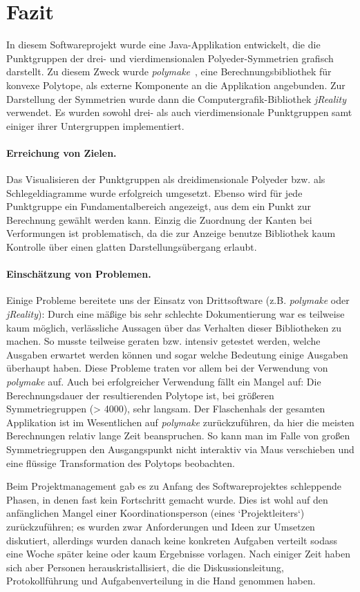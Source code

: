 \section{Fazit}
In diesem Softwareprojekt wurde eine Java-Applikation entwickelt, die die Punktgruppen der drei- und vierdimensionalen
Polyeder-Symmetrien grafisch darstellt. Zu diesem Zweck wurde \emph{polymake}~\cite{polymake}, eine Berechnungsbibliothek für
konvexe Polytope, als externe Komponente an die Applikation angebunden. Zur Darstellung der Symmetrien wurde dann die Computergrafik-Bibliothek
\emph{jReality}~\cite{jreality} verwendet.
Es wurden sowohl drei- als auch vierdimensionale Punktgruppen samt einiger ihrer Untergruppen implementiert.

\paragraph{Erreichung von Zielen.}
Das Visualisieren der Punktgruppen als dreidimensionale Polyeder bzw. als Schlegeldiagramme wurde erfolgreich umgesetzt. Ebenso wird für jede Punktgruppe ein Fundamentalbereich angezeigt, aus dem ein Punkt zur Berechnung gewählt werden kann. 
Einzig die Zuordnung der Kanten bei Verformungen ist problematisch, da die zur Anzeige benutze Bibliothek kaum Kontrolle über
einen glatten Darstellungsübergang erlaubt.
\paragraph{Einschätzung von Problemen.}
Einige Probleme bereitete uns der Einsatz von Drittsoftware (z.B. \emph{polymake} oder \emph{jReality}): Durch eine mäßige bis sehr schlechte
Dokumentierung war es teilweise kaum möglich, verlässliche Aussagen über das Verhalten dieser Bibliotheken zu machen. So musste teilweise geraten bzw. intensiv getestet werden, welche Ausgaben erwartet werden können und sogar welche Bedeutung einige Ausgaben überhaupt haben. Diese Probleme traten vor allem bei der Verwendung von \emph{polymake} auf.
Auch bei erfolgreicher Verwendung fällt ein Mangel auf: Die Berechnungsdauer der resultierenden Polytope ist, bei größeren Symmetriegruppen (> 4000), sehr langsam. Der Flaschenhals der gesamten Applikation ist im Wesentlichen auf \emph{polymake} zurückzuführen, da hier die meisten Berechnungen relativ lange Zeit beanspruchen. So kann man im Falle von großen Symmetriegruppen den Ausgangspunkt nicht interaktiv via Maus
verschieben und eine flüssige Transformation des Polytops beobachten.

\noindent Beim Projektmanagement gab es zu Anfang des Softwareprojektes schleppende Phasen, in denen fast kein Fortschritt gemacht wurde.
Dies ist wohl auf den anfänglichen Mangel einer Koordinationsperson (eines `Projektleiters`) zurückzuführen; es wurden zwar Anforderungen und
Ideen zur Umsetzen diskutiert, allerdings wurden danach keine konkreten Aufgaben verteilt sodass eine Woche später keine oder kaum Ergebnisse vorlagen. Nach einiger Zeit haben sich aber Personen herauskristallisiert, die die Diskussionsleitung, Protokollführung und Aufgabenverteilung 
in die Hand genommen haben.

